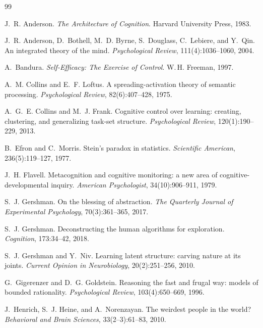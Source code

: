 \documentclass[11pt]{article}
\begin{document}
\begin{thebibliography}{99}

J.~R. Anderson.
\newblock \emph{The Architecture of Cognition}.
\newblock Harvard University Press, 1983.

J.~R. Anderson, D.~Bothell, M.~D. Byrne, S.~Douglass, C.~Lebiere, and Y.~Qin.
\newblock An integrated theory of the mind.
\newblock \emph{Psychological Review}, 111(4):1036--1060, 2004.

A.~Bandura.
\newblock \emph{Self-Efficacy: The Exercise of Control}.
\newblock W.\,H. Freeman, 1997.

A.~M. Collins and E.~F. Loftus.
\newblock A spreading-activation theory of semantic processing.
\newblock \emph{Psychological Review}, 82(6):407--428, 1975.

A.~G.~E. Collins and M.~J. Frank.
\newblock Cognitive control over learning: creating, clustering, and generalizing task-set structure.
\newblock \emph{Psychological Review}, 120(1):190--229, 2013.

B.~Efron and C.~Morris.
\newblock Stein's paradox in statistics.
\newblock \emph{Scientific American}, 236(5):119--127, 1977.

J.~H. Flavell.
\newblock Metacognition and cognitive monitoring: a new area of cognitive-developmental inquiry.
\newblock \emph{American Psychologist}, 34(10):906--911, 1979.

S.~J. Gershman.
\newblock On the blessing of abstraction.
\newblock \emph{The Quarterly Journal of Experimental Psychology}, 70(3):361--365, 2017.

S.~J. Gershman.
\newblock Deconstructing the human algorithms for exploration.
\newblock \emph{Cognition}, 173:34--42, 2018.

S.~J. Gershman and Y.~Niv.
\newblock Learning latent structure: carving nature at its joints.
\newblock \emph{Current Opinion in Neurobiology}, 20(2):251--256, 2010.

G.~Gigerenzer and D.~G. Goldstein.
\newblock Reasoning the fast and frugal way: models of bounded rationality.
\newblock \emph{Psychological Review}, 103(4):650--669, 1996.

J.~Henrich, S.~J. Heine, and A.~Norenzayan.
\newblock The weirdest people in the world?
\newblock \emph{Behavioral and Brain Sciences}, 33(2--3):61--83, 2010.


\end{thebibliography}
\end{document}
